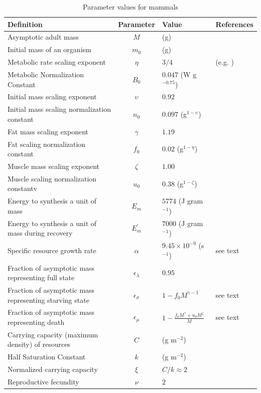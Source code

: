 \documentclass[twocolumn,preprintnumbers,amsmath,amssymb,superscriptaddress]{revtex4}
\begin{document}
 \begin{table}[h]
\caption{Parameter values for mammals}
\label{param}
    \begin{center}
    \footnotesize
     \begin{tabular}{p{3.8cm} c p{2.2cm} p{1.4cm}}
     \hline
    
     Definition & Parameter & Value & References  \\
     \hline
   Asymptotic adult mass & $M$ & (g) &  \\
   Initial mass of an organism & $m_{0}$ & (g) &  \\
   Metabolic rate scaling exponent & $\eta$ & $3/4$  &  (e.g. \citep{West:2001bv,moses2008rmo,hou}) \\
   Metabolic Normalization Constant & $B_{0}$ & $0.047$ (W g$^{-0.75}$)    & \citep{hou}  \\
   Initial mass scaling exponent & $\upsilon$ & $0.92$ &  \citep{blueweiss1978relationships,peters1986ecological} \\
   Initial mass scaling normalization constant & $n_{0}$ & $0.097$ (g$^{1-\upsilon}$) & \citep{blueweiss1978relationships,peters1986ecological}  \\   
   Fat mass scaling exponent & $\gamma$ & $1.19$ & \citep{Lindstedt:1985hm} \\
   Fat scaling normalization constant & $f_{0}$ & $0.02$ (g$^{1-\eta}$) & \citep{Lindstedt:1985hm}\\
   Muscle mass scaling exponent & $\zeta$ & $1.00$  & \citep{Lindstedt:2002td} \\
   Muscle scaling normalization constantv& $u_{0}$ & $0.38$ (g$^{1-\zeta}$)  & \citep{Lindstedt:2002td} \\
   Energy to synthesis a unit of mass & $E_{m}$ & $5774$ (J gram$^{-1}$)  &  \citep{moses2008rmo,West:2001bv,hou} \\
   Energy to synthesis a unit of mass during recovery & $E_{m}^{\prime}$ & $7000$ (J gram$^{-1}$) & \citep{stryer,hou} \\
   Specific resource growth rate & $\alpha$ & $9.45\times10^{-9}$ (s$^{-1}$) & see text  \\
   Fraction of asymptotic mass representing full state & $\epsilon_{\lambda}$ & $0.95$ & \citep{West:2001bv}  \\
   Fraction of asymptotic mass representing starving state & $\epsilon_{\sigma}$ & $1-f_{0}M^{\gamma-1}$ & see text  \\
   Fraction of asymptotic mass representing death & $\epsilon_{\mu}$ & $1-\frac{f_{0}M^{\gamma}+u_{0}M^{\zeta}}{M}$ & see text \\
   Carrying capacity (maximum density) of resources & $C$ & (g m$^{-2}$) & \\
   Half Saturation Constant & $k$ & (g m$^{-2}$) &   \\
   Normalized carrying capacity & $\xi$ & $C/k\approx2$ &   \\
   Reproductive fecundity & $\nu$ & $2$ & \citep{}  \\ 
   

\end{tabular}
\end{center}
\end{table}
\end{document}
